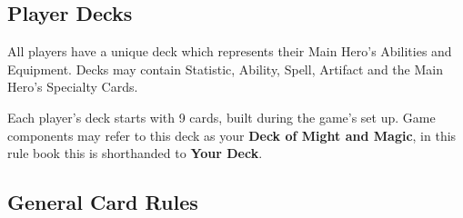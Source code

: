 \subsection*{\hypertarget{Playerdecks}{Player Decks}}
All players have a unique deck which represents their Main Hero's Abilities and Equipment.
Decks may contain Statistic, Ability, Spell, Artifact and the Main Hero’s Specialty Cards.

Each player’s deck starts with 9 cards, built during the game’s set up.
Game components may refer to this deck as your \textbf{Deck of Might and Magic}, in this rule book this is shorthanded to \textbf{Your Deck}.
\subsection*{General Card Rules}
